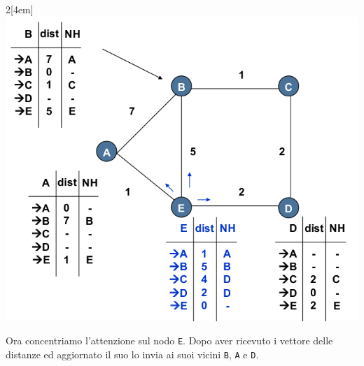 \documentclass[12pt]{article}
\def\code#1{\texttt{#1}}
\begin{document}
\begin{multicols}{2}[\columnsep4em] 	
	\includegraphics[scale=0.3]{livello_di_rete-img11.png}
	\columnbreak
	
	Ora concentriamo l'attenzione sul nodo \code{E}. Dopo aver ricevuto i vettore delle distanze ed aggiornato il suo lo 
	invia ai suoi vicini \code{B}, \code{A} e \code{D}. 
\end{multicols}
\end{document}
